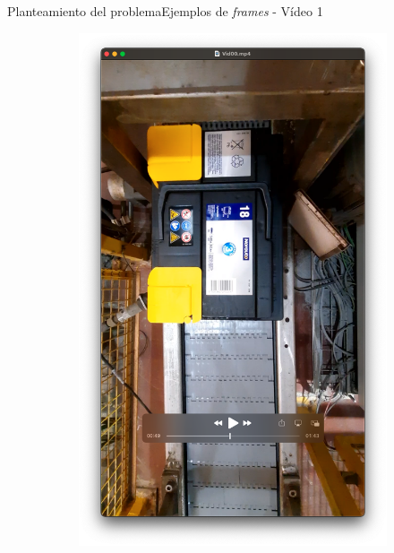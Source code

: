 \documentclass{beamer}
\begin{document}
\begin{frame}{Planteamiento del problema}{Ejemplos de \textit{frames} - Vídeo 1}
\begin{figure}
\begin{subfigure}[b]{0.4\textwidth}
        \includegraphics[width=\textwidth]{img/B2.png}
    \end{subfigure}
\end{figure}
\end{frame}
\end{document}
